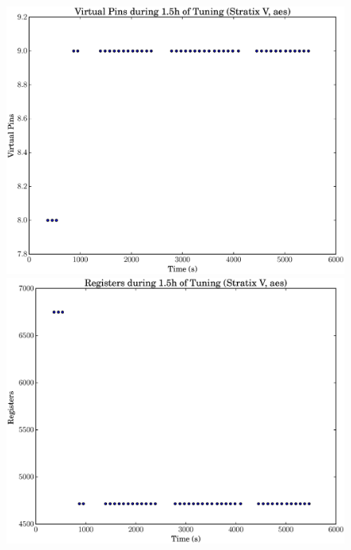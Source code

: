 \documentclass[12pt, a4paper]{article}
\begin{document}
\begin{figure}[htpb]
    \begin{minipage}{.48\textwidth}
        \includegraphics[scale=.25]{aes_pins_5400_chstone_StratixV}
    \end{minipage}%
    \hfill
    \begin{minipage}{.48\textwidth}
        \includegraphics[scale=.25]{aes_regs_5400_chstone_StratixV}
    \end{minipage}%


\end{figure}
\end{document}
